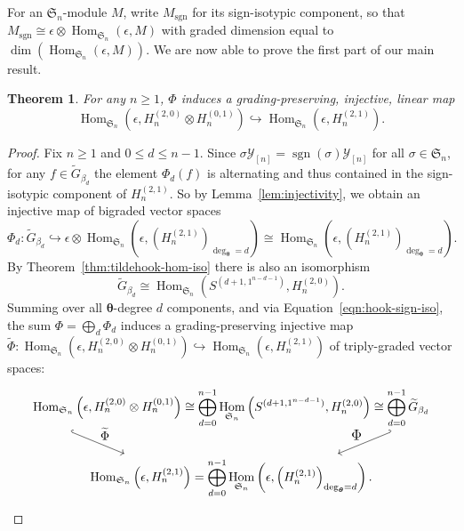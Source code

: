 \documentclass[11pt, noadjust, reqno]{amsart}
\newtheorem{theorem}{Theorem}[section]
\theoremstyle{definition}
\theoremstyle{remark}
\numberwithin{equation}{section}
\newcommand{\0}{\emptyset}
\renewcommand{\S}{\mathfrak{S}}
\newcommand{\cY}{\mathcal{Y}}
\DeclareMathOperator{\sgn}{sgn}
\DeclareMathOperator{\Hom}{Hom}
\begin{document}
For an $\mathfrak{S}_n$-module $M$, write $M_{\sgn}$ for its sign-isotypic component, so that $M_{\sgn} \cong \epsilon \otimes \Hom_{\mathfrak{S}_n} (\epsilon, M)$ with graded dimension equal to $\dim(\Hom_{\mathfrak{S}_n} (\epsilon, M))$. 
We are now able to prove the first part of our main result.


\begin{theorem}\label{thm:Phi-injection}
For any $n\geq 1$, $\Phi$ induces a grading-preserving, injective, linear map
\[
\Hom_{\mathfrak{S}_n}\left(\epsilon, H_n^{(2,0)} \otimes H_n^{(0,1)}\right) \hookrightarrow \Hom_{\S_n}\left(\epsilon, H_n^{(2,1)}\right).
\]
\end{theorem}

\begin{proof}
    Fix $n\geq 1$ and $0 \leq d \leq n-1$.
    Since $\sigma \cY_{[n]} = \sgn(\sigma) \cY_{[n]}$ for all $\sigma \in \S_n$, for any $f \in \widetilde{G}_{\beta_d}$ the element $\Phi_d(f)$ is alternating and thus contained in the sign-isotypic component of $H_n^{(2,1)}$.
    So by Lemma~\ref{lem:injectivity}, 
    we obtain an injective map of bigraded vector spaces
    \[
\Phi_d: \widetilde{G}_{\beta_d} \hookrightarrow \epsilon \otimes \Hom_{\S_n}\left(\epsilon,\left(H_n^{(2,1)}\right)_{\deg_{\bm\theta }=d}\right) \cong \Hom_{\S_n}\left(\epsilon,\left(H_n^{(2,1)}\right)_{\deg_{\bm{\theta}} =d}\right).
    \]
By Theorem~\ref{thm:tildehook-hom-iso} there is also an isomorphism
    \[
    \widetilde{G}_{\beta_d} \cong \Hom_{\S_n}(S^{(d+1,1^{n-d-1})}, H_n^{(2,0)}).
    \]
Summing over all $\bm{\theta}$-degree $d$ components, and via Equation~\eqref{eqn:hook-sign-iso}, the sum $\Phi =\bigoplus_d \Phi_d$ induces a grading-preserving injective map $\widetilde{\Phi}:\Hom_{\S_n}\left( \epsilon, H_n^{(2,0)} \otimes H_n^{(0,1)}\right) \hookrightarrow \Hom_{\S_n}\left(\epsilon, H_n^{(2,1)}\right)$ of triply-graded vector spaces:
\[
\begin{tikzcd}
\Hom_{\S_n}\left( \epsilon, H_n^{(2,0)} \otimes H_n^{(0,1)}\right) \arrow[d,hook,"\widetilde{\Phi}"{font=\normalsize}, start anchor = {[xshift=-30ex]}, end anchor = {[xshift=-20ex]}]
\cong \displaystyle\bigoplus_{d=0}^{n-1}\Hom_{\S_n}\left( S^{(d+1,1^{n-d-1})}, H_n^{(2,0)}\right) 
\cong \bigoplus_{d=0}^{n-1} \widetilde{G}_{\beta_d}
\arrow[d,hook',"\Phi"' {font=\large},start anchor = {[xshift=30ex]}, end anchor = {[xshift=20ex]}]\\
\Hom_{\S_n}\left(\epsilon, H_n^{(2,1)}\right) =\displaystyle\bigoplus_{d=0}^{n-1} \Hom_{\S_n}\left(\epsilon,\left(H_n^{(2,1)}\right)_{\deg_{\bm{\theta}} =d}\right).
\end{tikzcd}
\]
\end{proof}
\end{document}

